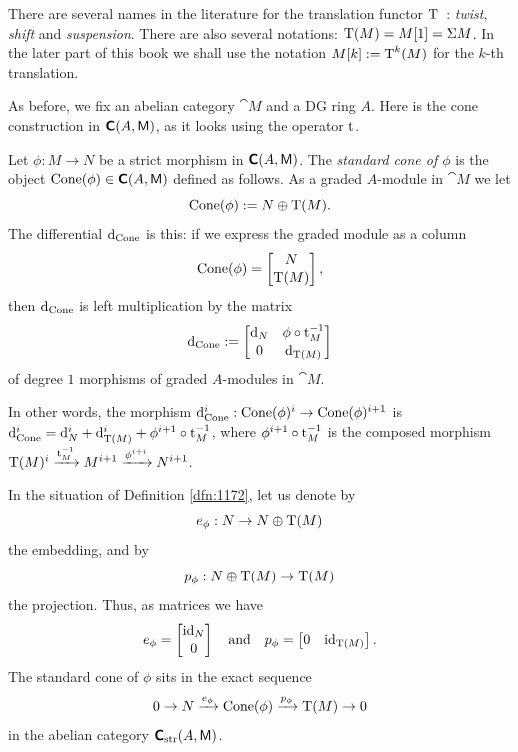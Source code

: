 \begin{rem} \label{rem:1275}
There are several names in the literature for the translation functor
$\operatorname{T}$~: {\em twist}, {\em shift} and {\em suspension}. There are also 
several notations: $\operatorname{T}(M) = M[1] = \Sigma M$.
In the later part of this book we shall use the notation 
$M[k] := \operatorname{T}^{k}(M)$ for the $k$-th translation. 
\end{rem}


 \label{subsec:cone}

As before,  we fix an abelian category $\cat{M}$ and a DG ring $A$.
Here is the cone construction in $\boldsymbol{\mathsf{C}}(A, \operatorname{\mathsf{M}})$, as it looks 
using the operator $\operatorname{t}$. 

\begin{dfn} \label{dfn:1172}
Let $\phi : M \to N$ be a strict morphism in $\boldsymbol{\mathsf{C}}(A, \operatorname{\mathsf{M}})$.
The {\em standard cone of $\phi$}%
is the object 
$\operatorname{Cone}(\phi) \in \boldsymbol{\mathsf{C}}(A, \operatorname{\mathsf{M}})$
defined as follows. As a graded $A$-module in $\cat{M}$ we let
\[ \operatorname{Cone}(\phi) := N \oplus \operatorname{T}(M) . \]
The differential $\mathrm{d}_{\mathrm{Cone}}$ is this: if we express 
the graded module as a column
\[ \operatorname{Cone}(\phi) = \begin{bmatrix} N \\[0.1em] \operatorname{T}(M) \end{bmatrix} , \]
then $\mathrm{d}_{\mathrm{Cone}}$ is left multiplication by the matrix
\[ \mathrm{d}_{\mathrm{Cone}} :=
\begin{bmatrix} \mathrm{d}_N & \phi \circ \operatorname{t}_M^{-1} \\[0.1em] 0 & \mathrm{d}_{\operatorname{T}(M)} \end{bmatrix} \]
of degree $1$ morphisms of graded $A$-modules in $\cat{M}$.
\end{dfn}

In other words, the morphism 
$\mathrm{d}_{\mathrm{Cone}}^i : \operatorname{Cone}(\phi)^i \to \operatorname{Cone}(\phi)^{i + 1}$
is 
$\mathrm{d}_{\mathrm{Cone}}^i = \mathrm{d}^i_N + \mathrm{d}^i_{\operatorname{T}(M)} + \phi^{i + 1} \circ 
\operatorname{t}_M^{-1}$,
where $\phi^{i + 1} \circ \operatorname{t}_M^{-1}$ is the composed morphism 
$\operatorname{T}(M)^i \xrightarrow{\operatorname{t}_M^{-1}} M^{i + 1} \xrightarrow{\phi^{i + i}}  N^{i + 1}$.

In the situation of Definition \ref{dfn:1172}, let us denote by 
\begin{equation} \label{eqn:1195}
e_{\phi} : N \to N \oplus \operatorname{T}(M) 
\end{equation}
the embedding, and by
\begin{equation} \label{eqn:1196}
p_{\phi} : N \oplus \operatorname{T}(M) \to \operatorname{T}(M)
\end{equation}
the projection. 
Thus, as matrices we have 
\[ e_{\phi} = \begin{bmatrix}  \operatorname{id}_N  \\[0.1em] 0  \end{bmatrix} \quad \textup{and} \quad 
p_{\phi} = \begin{bmatrix}  0 &  \operatorname{id}_{\operatorname{T}(M)}  \end{bmatrix} . \]
The standard cone of $\phi$ sits in the exact sequence 
\begin{equation} \label{eqn:1815}
0 \to N \xrightarrow{e_{\phi}} \operatorname{Cone}(\phi) \xrightarrow{p_{\phi}} \operatorname{T}(M) \to 0
\end{equation}
in the abelian category $\boldsymbol{\mathsf{C}}_{\mathrm{str}}(A, \operatorname{\mathsf{M}})$. 

